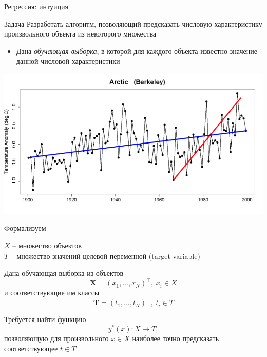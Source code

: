 \documentclass[10pt,a4paper]{beamer}
\begin{document}
\begin{frame}{Регрессия: интуиция}

\begin{block}{Задача}
Разработать алгоритм, позволяющий предсказать числовую характеристику произвольного объекта из некоторого множества
\begin{itemize}
\item Дана {\it обучающая выборка}, в которой для каждого объекта известно значение данной числовой характеристики
\end{itemize}
\end{block}

\begin{center}
\includegraphics[scale=0.3]{images/kioto.png}
\end{center}

\end{frame}


\begin{frame}{Формализуем}

$X$ -- множество объектов \\
$T$ -- множество значений целевой переменной (target variable) 
\vspace{1em}

Дана обучающая выборка из объектов
\[
\boldsymbol X = (x_1, \ldots, x_N)^\top, \; x_i \in X
\]
и соответствующие им классы 
\[
\boldsymbol T = (t_1, \ldots, t_N)^\top, \; t_i \in T
\]

Требуется найти функцию 
\[
y^*(x): X \rightarrow T,
\] 
позволяющую для произвольного $x \in X$ наиболее точно предсказать соответствующее $t \in T$

\end{frame}

\end{document}
